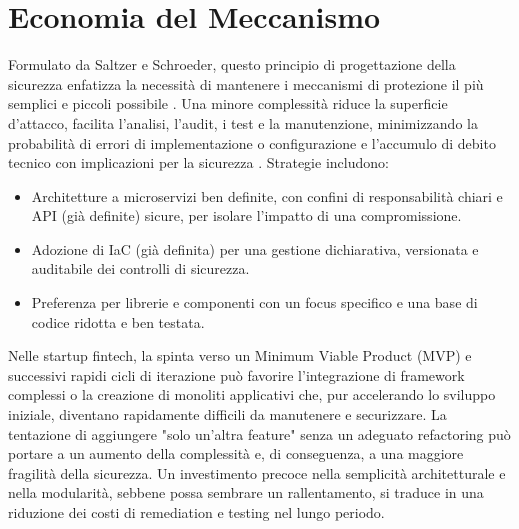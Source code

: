 \section{Economia del Meccanismo}
Formulato da Saltzer e Schroeder, questo principio di progettazione della sicurezza enfatizza la necessità di mantenere i meccanismi di protezione il più semplici e piccoli possibile \cite{Saltzer_Schroeder_1975}. Una minore complessità riduce la superficie d'attacco, facilita l'analisi, l'audit, i test e la manutenzione, minimizzando la probabilità di errori di implementazione o configurazione e l'accumulo di debito tecnico con implicazioni per la sicurezza \cite{Smith_2012_SaltzerReview}.
Strategie includono:
\begin{itemize}
\item Architetture a microservizi ben definite, con confini di responsabilità chiari e API (già definite) sicure, per isolare l'impatto di una compromissione.
\item Adozione di IaC (già definita) per una gestione dichiarativa, versionata e auditabile dei controlli di sicurezza.
\item Preferenza per librerie e componenti con un focus specifico e una base di codice ridotta e ben testata.
\end{itemize}
Nelle startup fintech, la spinta verso un Minimum Viable Product (MVP) e successivi rapidi cicli di iterazione può favorire l'integrazione di framework complessi o la creazione di monoliti applicativi che, pur accelerando lo sviluppo iniziale, diventano rapidamente difficili da manutenere e securizzare. La tentazione di aggiungere "solo un'altra feature" senza un adeguato refactoring può portare a un aumento della complessità e, di conseguenza, a una maggiore fragilità della sicurezza. Un investimento precoce nella semplicità architetturale e nella modularità, sebbene possa sembrare un rallentamento, si traduce in una riduzione dei costi di remediation e testing nel lungo periodo.
